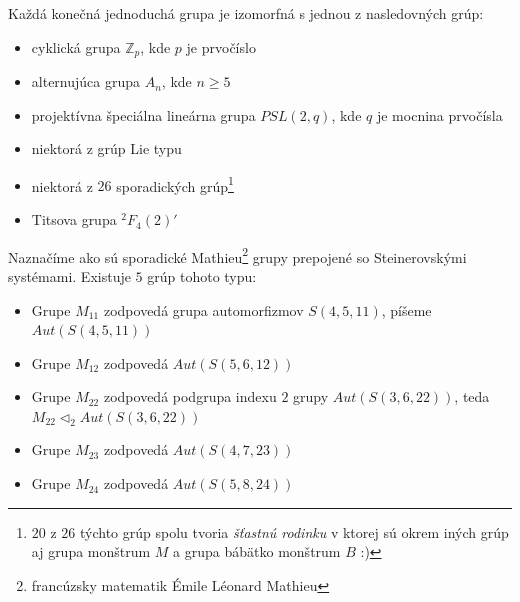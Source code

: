 \begin{theorem_hard}
	Každá konečná jednoduchá grupa je izomorfná s jednou z nasledovných grúp:
	\begin{itemize}
		\item cyklická grupa $\mathbb{Z}_p$, kde $p$ je prvočíslo
		\item alternujúca grupa $A_n$, kde $n \geq 5$
		\item projektívna špeciálna lineárna grupa $PSL(2, q)$, kde $q$ je mocnina prvočísla
		\item niektorá z grúp Lie typu
		\item niektorá z $26$ sporadických grúp\footnote{$20$ z $26$ týchto grúp spolu tvoria \textit{šťastnú rodinku} v ktorej sú okrem iných grúp aj grupa monštrum $M$ a grupa bábätko monštrum $B$ :)}
		\item Titsova grupa $^2F_4(2)'$
	\end{itemize}
\end{theorem_hard}

Naznačíme ako sú sporadické Mathieu\footnote{francúzsky matematik Émile Léonard Mathieu} grupy prepojené so Steinerovskými systémami. Existuje $5$ grúp tohoto typu:

\begin{itemize}
	\item Grupe $M_{11}$ zodpovedá grupa automorfizmov $S(4,5,11)$, píšeme $Aut(S(4,5,11))$ 	
	\item Grupe $M_{12}$ zodpovedá $Aut(S(5,6,12))$
	\item Grupe $M_{22}$ zodpovedá podgrupa indexu $2$ grupy $Aut(S(3,6,22))$, teda $M_{22} \triangleleft_2 Aut(S(3,6,22))$
	\item Grupe $M_{23}$ zodpovedá $Aut(S(4,7,23))$
	\item Grupe $M_{24}$ zodpovedá $Aut(S(5,8,24))$
\end{itemize}
